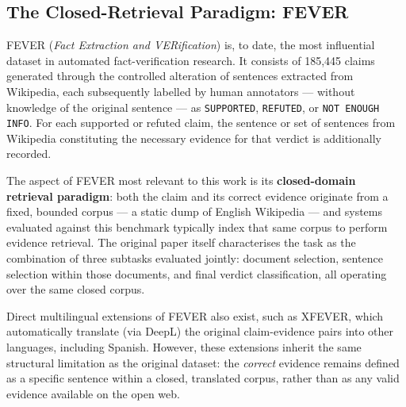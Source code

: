 
\subsection{The Closed-Retrieval Paradigm: FEVER}
\label{subsec:fever}

FEVER (\textit{Fact Extraction and VERification}) \cite{thorne2018fever}
is, to date, the most influential dataset in automated
fact-verification research. It consists of 185,445 claims generated
through the controlled alteration of sentences extracted from
Wikipedia, each subsequently labelled by human annotators ---
without knowledge of the original sentence --- as
\texttt{SUPPORTED}, \texttt{REFUTED}, or \texttt{NOT ENOUGH INFO}.
For each supported or refuted claim, the sentence or set of
sentences from Wikipedia constituting the necessary evidence for
that verdict is additionally recorded.

The aspect of FEVER most relevant to this work is its
\textbf{closed-domain retrieval paradigm}: both the claim and its
correct evidence originate from a fixed, bounded corpus --- a static
dump of English Wikipedia --- and systems evaluated against this
benchmark typically index that same corpus to perform evidence
retrieval. The original paper itself characterises the task as the
combination of three subtasks evaluated jointly: document selection,
sentence selection within those documents, and final verdict
classification, all operating over the same closed corpus.

Direct multilingual extensions of FEVER also exist, such as XFEVER,
which automatically translate (via DeepL) the original claim-evidence
pairs into other languages, including Spanish. However, these
extensions inherit the same structural limitation as the original
dataset: the \textit{correct} evidence remains defined as a specific
sentence within a closed, translated corpus, rather than as any
valid evidence available on the open web.
